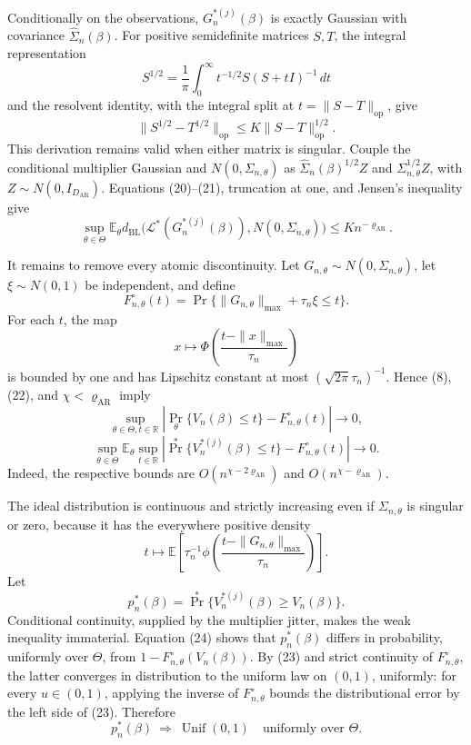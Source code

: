 Conditionally on the observations, \(G_n^{*(j)}(\beta)\) is exactly Gaussian with covariance \(\widehat\Sigma_n(\beta)\).  For positive semidefinite matrices \(S,T\), the integral representation
\[
 S^{1/2}=\frac1\pi\int_0^\infty t^{-1/2}S(S+tI)^{-1}\,dt
\]
and the resolvent identity, with the integral split at \(t=\|S-T\|_{\mathrm{op}}\), give
\[
 \|S^{1/2}-T^{1/2}\|_{\mathrm{op}}
 \leq K\|S-T\|_{\mathrm{op}}^{1/2}. \tag{21}
\]
This derivation remains valid when either matrix is singular.  Couple the conditional multiplier Gaussian and \(N(0,\Sigma_{n,\theta})\) as \(\widehat\Sigma_n(\beta)^{1/2}Z\) and \(\Sigma_{n,\theta}^{1/2}Z\), with \(Z\sim N(0,I_{D_{\mathrm{AR}}})\).  Equations (20)--(21), truncation at one, and Jensen's inequality give
\[
 \sup_{\theta\in\Theta}\mathbb E_\theta
 d_{\mathrm{BL}}\bigl(
 \mathcal L^*(G_n^{*(j)}(\beta)),N(0,\Sigma_{n,\theta})
 \bigr)
 \leq K n^{-\varrho_{\mathrm{AR}}}. \tag{22}
\]

It remains to remove every atomic discontinuity.  Let \(G_{n,\theta}\sim N(0,\Sigma_{n,\theta})\), let \(\xi\sim N(0,1)\) be independent, and define
\[
 F_{n,\theta}^{\circ}(t)
 =\Pr\{\|G_{n,\theta}\|_{\max}+\tau_n\xi\leq t\}.
\]
For each \(t\), the map
\[
 x\longmapsto
 \Phi\!\left(\frac{t-\|x\|_{\max}}{\tau_n}\right)
\]
is bounded by one and has Lipschitz constant at most \((\sqrt{2\pi}\tau_n)^{-1}\).  Hence (8), (22), and \(\chi<\varrho_{\mathrm{AR}}\) imply
\[
 \sup_{\theta\in\Theta,t\in\mathbb R}
 \left|\Pr_\theta\{V_n(\beta)\leq t\}
 -F_{n,\theta}^{\circ}(t)\right|\longrightarrow0, \tag{23}
\]
\[
 \sup_{\theta\in\Theta}\mathbb E_\theta\sup_{t\in\mathbb R}
 \left|\Pr^*\{V_n^{*(j)}(\beta)\leq t\}
 -F_{n,\theta}^{\circ}(t)\right|\longrightarrow0. \tag{24}
\]
Indeed, the respective bounds are \(O(n^{\chi-2\varrho_{\mathrm{AR}}})\) and \(O(n^{\chi-\varrho_{\mathrm{AR}}})\).

The ideal distribution is continuous and strictly increasing even if \(\Sigma_{n,\theta}\) is singular or zero, because it has the everywhere positive density
\[
 t\longmapsto
 \mathbb E\!\left[\tau_n^{-1}\phi\!\left(
 \frac{t-\|G_{n,\theta}\|_{\max}}{\tau_n}\right)\right]. \tag{25}
\]
Let
\[
 p_n^*(\beta)=\Pr^*\{V_n^{*(j)}(\beta)\geq V_n(\beta)\}.
\]
Conditional continuity, supplied by the multiplier jitter, makes the weak inequality immaterial.  Equation (24) shows that \(p_n^*(\beta)\) differs in probability, uniformly over \(\Theta\), from \(1-F_{n,\theta}^{\circ}(V_n(\beta))\).  By (23) and strict continuity of \(F_{n,\theta}^{\circ}\), the latter converges in distribution to the uniform law on \((0,1)\), uniformly: for every \(u\in(0,1)\), applying the inverse of \(F_{n,\theta}^{\circ}\) bounds the distributional error by the left side of (23).  Therefore
\[
 p_n^*(\beta)\ \Longrightarrow\ \operatorname{Unif}(0,1)
 \quad\text{uniformly over }\Theta. \tag{26}
\]

